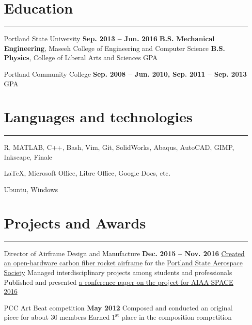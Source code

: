 \section{Education}
	\noindent\rule{\textwidth}{\hlinewidth}
	\begin{innerlist}
	\item Portland State University		\hfill\textbf{Sep. 2013 -- Jun. 2016}
		\subitem \textbf{B.S. Mechanical Engineering}, Maseeh College of Engineering and Computer Science 
		\subitem\textbf{B.S. Physics}, College of Liberal Arts and Sciences
		 GPA
	\\
	\item Portland Community College  \hfill\textbf{Sep. 2008 -- Jun. 2010, Sep. 2011 -- Sep. 2013}
		 GPA
	\end{innerlist}
\vfill
\section{Languages and technologies}

\noindent\rule{\textwidth}{\hlinewidth}
    \begin{innerlist}
        \item R, MATLAB, C++, Bash, Vim, Git, SolidWorks, Abaqus, AutoCAD, GIMP, Inkscape, Finale
        \item \LaTeX, Microsoft Office, Libre Office, Google Docs, etc.
	\item Ubuntu, Windows
    \end{innerlist}
\vfill
\section{Projects and Awards}
\noindent\rule{\textwidth}{\hlinewidth}
	\begin{innerlist}
	\item Director of Airframe Design and Manufacture
		\hfill\textbf{Dec. 2015 -- Nov. 2016} %
		\subitem \href{https://github.com/psas/sw-cad-airframe-lv3.0}{Created 
			an open-hardware carbon fiber rocket airframe} for the 
			\href{http://psas.pdx.edu/}{Portland State Aerospace Society}
		\subitem Managed interdisciplinary projects among students and professionals
		\subitem Published and presented \href{http://arc.aiaa.org/doi/pdf/10.2514/6.2016-5365}{a conference paper on the project for AIAA SPACE 2016}
	\\
	\item PCC Art Beat competition \hfill\textbf{May 2012}
		\subitem Composed and conducted an original piece for about 30 members
		\subitem Earned $1^\text{st}$ place in the composition competition
	\end{innerlist}
\vfill
